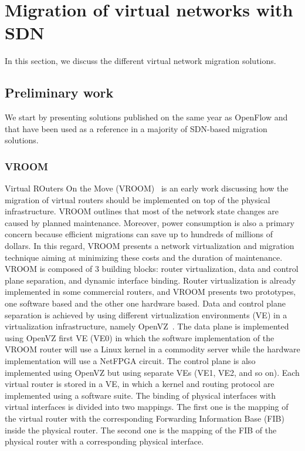 \newpage
\section{Migration of virtual networks with SDN}
\label{sec:sota-vnmigration}
In this section, we discuss the different virtual network migration solutions.


\subsection{Preliminary work}

We start by presenting solutions published on the same year as OpenFlow and that have been used as a reference in a majority of SDN-based migration solutions.

\subsubsection{VROOM}
Virtual ROuters On the Move (VROOM)~\cite{VROOM-Wang2008} is an early work discussing how the migration of virtual routers should be implemented on top of the physical infrastructure. 
VROOM outlines that most of the network state changes are caused by planned maintenance.
Moreover, power consumption is also a primary concern because efficient migrations can save up to hundreds of millions of dollars.
In this regard, VROOM presents a network virtualization and migration technique aiming at minimizing these costs and the duration of maintenance.
VROOM is composed of 3 building blocks: router virtualization, data and control plane separation, and dynamic interface binding.
Router virtualization is already implemented in some commercial routers, and VROOM presents two prototypes, one software based and the other one hardware based.
Data and control plane separation is achieved by using different virtualization environments (VE) in a virtualization infrastructure, namely OpenVZ~\cite{openvz}.
The data plane is implemented using OpenVZ first VE (VE0) in which the software implementation of the VROOM router will use a Linux kernel in a commodity server while the hardware implementation will use a NetFPGA circuit.
The control plane is also implemented using OpenVZ but using separate VEs (VE1, VE2, and so on).
Each virtual router is stored in a VE, in which a kernel and routing protocol are implemented using a software suite.
The binding of physical interfaces with virtual interfaces is divided into two mappings.
The first one is the mapping of the virtual router with the corresponding Forwarding Information Base (FIB) inside the physical router.
The second one is the mapping of the FIB of the physical router with a corresponding physical interface.


